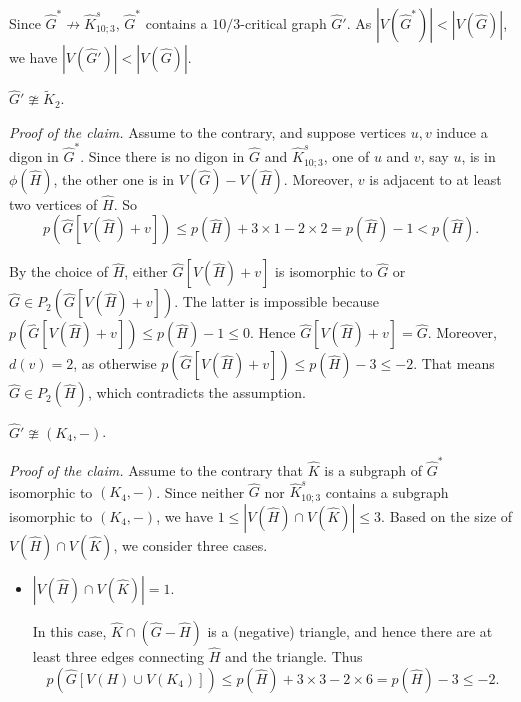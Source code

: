 \documentclass[10pt,a4paper]{amsart}
\makeatletter
\renewenvironment{proof}[1][\proofname]{\par
	\pushQED{\qed}%
	\normalfont \topsep6\p@\@plus6\p@\relax
	\trivlist
	\item[\hskip\labelsep
	\bfseries
	#1\@addpunct{.}]\ignorespaces
}{%
	\popQED\endtrivlist\@endpefalse
}
\makeatother
\begin{document}
\begin{proof}
	
	Since  $\widehat{G}^*\not\to \widehat{K}^s_{10;3}$, $\widehat{G}^*$ contains a $10/3$-critical graph $\widehat{G}'$. As $|V(\widehat{G}^*)|<|V(\widehat{G})|$, we have $|V(\widehat{G}')|<|V(\widehat{G})|$. 
	
	
	
	\begin{claim}\label{clm:digon}
		$\widehat{G}'\ncong \widetilde{K}_2$.
	\end{claim}
	
	\noindent\emph{Proof of the claim.} Assume to the contrary, and suppose vertices $u, v$ induce a digon in $\widehat{G}^*$. Since there is no digon in $\widehat{G}$ and $\widehat{K}^s_{10;3}$, one of $u$ and $v$, say $u$, is in $\phi(\widehat{H})$, the other one is in $V(\widehat{G})-V(\widehat{H})$. Moreover, $v$ is adjacent to at least two vertices of $\widehat{H}$. So $$p(\widehat{G}[V(\widehat{H})+v])\leq p(\widehat{H})+3\times 1-2 \times 2=p(\widehat{H})-1<p(\widehat{H}) .$$
	
	By the choice of $\widehat{H}$,  either $\widehat{G}[V(\widehat{H})+v]$ is isomorphic to $\widehat{G}$ or $\widehat{G}\in P_2(\widehat{G}[V(\widehat{H})+v])$. The latter is impossible because $p(\widehat{G}[V(\widehat{H})+v])\leq p(\widehat{H})-1\leq 0$. Hence $\widehat{G}[V(\widehat{H})+v]=\widehat{G}$. Moreover, $d(v)=2$, as otherwise $p(\widehat{G}[V(\widehat{H})+v])\leq p(\widehat{H})-3\leq -2$. That means $\widehat{G}\in P_2(\widehat{H})$, which contradicts the assumption.  
	
	
	\begin{claim}\label{clm:K_4}
		$\widehat{G}'\ncong (K_4,-)$.
	\end{claim}
	
	\noindent\emph{Proof of the claim.} Assume to the contrary that $\widehat{K}$ is a subgraph of  $\widehat{G}^*$ isomorphic to $(K_4,-)$. Since neither $\widehat{G}$ nor $\widehat{K}^s_{10;3}$ contains a subgraph isomorphic to $(K_4,-)$, we have $1\leq |V(\widehat{H}) \cap V(\widehat{K})|\leq 3$. Based on the size of $V(\widehat{H}) \cap V(\widehat{K})$, we consider three cases.
	\begin{itemize}
		\item[(1)] $|V(\widehat{H}) \cap V(\widehat{K})|=1$.
		
		In this case, $\widehat{K}\cap (\widehat{G}-\widehat{H})$  is a (negative) triangle, and hence there are at least three edges connecting $\widehat{H}$ and the triangle. Thus 
		$$p(\widehat{G}[V(H)\cup V(K_4)])\leq p(\widehat{H})+3\times 3-2\times 6=p(\widehat{H})-3\leq -2.$$ 
		

\end{itemize}
\end{proof}
\end{document}
